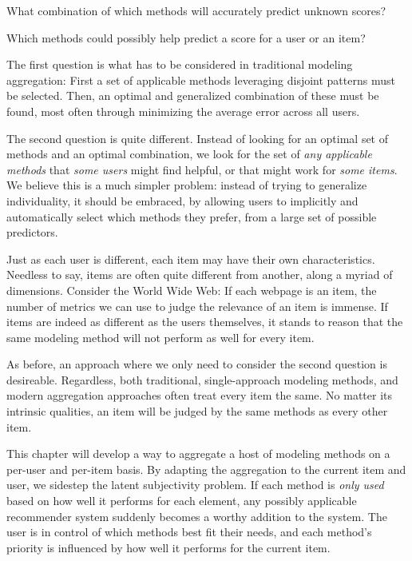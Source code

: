 \begin{enumerate*}
  \item What combination of which methods will accurately predict unknown scores?
  \item Which methods could possibly help predict a score for a user or an item?
\end{enumerate*}

The first question is what has to be considered in traditional modeling aggregation:
First a set of applicable methods leveraging disjoint patterns must be selected. 
Then, an optimal and generalized combination of these must be found,
most often through minimizing the average error across all users.

The second question is quite different. 
Instead of looking for an optimal set of methods and an optimal combination,
we look for the set of \emph{any applicable methods} that \emph{some users} might find helpful,
or that might work for \emph{some items}.
We believe this is a much simpler problem: 
instead of trying to generalize individuality,
it should be embraced, by allowing users to implicitly and automatically select which methods they prefer,
from a large set of possible predictors.

Just as each user is different, each item may have their own characteristics.
Needless to say, items are often quite different from another,
along a myriad of dimensions. Consider the World Wide Web:
If each webpage is an item, the number of metrics we can use to judge
the relevance of an item is immense.
If items are indeed as different as the users themselves, it stands to reason that the same 
modeling method will not perform as well for every item.

As before, an approach where we only need to consider the second question is desireable.
Regardless, both traditional, single-approach modeling methods, and modern aggregation approaches
often treat every item the same. No matter its intrinsic qualities, an item will be judged
by the same methods as every other item. 

This chapter will develop a way to aggregate a host of modeling methods on a per-user and per-item basis.
By adapting the aggregation to the current item and user, we sidestep the latent subjectivity problem. 
If each method is \emph{only used} based on how well it performs for each element,
any possibly applicable recommender system suddenly becomes a worthy addition to the system.
The user is in control of which methods best fit their needs, and
each method's priority is influenced by how well it performs for the current item.

\clearpage
